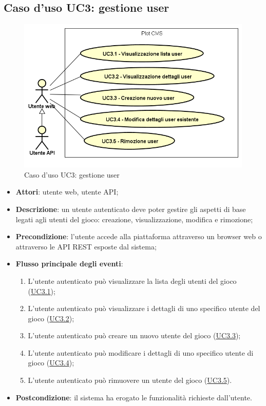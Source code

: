 \subsection{Caso d'uso UC3: gestione user}

        \begin{figure}[H]
            \centering
            \includegraphics[scale=0.95, width=\textwidth]{immagini/usecase/UC3.png}
            \caption{Caso d'uso UC3: gestione user}\label{fig:UC3} 
        \end{figure}
\begin{itemize}
\item \textbf{Attori}: utente web, utente API;
\item \textbf{Descrizione}: un utente autenticato deve poter gestire gli aspetti di base legati agli utenti del gioco: creazione, visualizzazione, modifica e rimozione; 
      \item \textbf{Precondizione}: l'utente accede alla piattaforma attraverso un browser web o attraverso le API REST esposte dal sistema;

        \item \textbf{Flusso principale degli eventi}:
          \begin{enumerate}
          \item L'utente autenticato può visualizzare la lista degli utenti del gioco (\hyperlink{UC3.1}{UC3.1});
          \item L'utente autenticato può visualizzare i dettagli di uno specifico utente del gioco (\hyperlink{UC3.2}{UC3.2});
          \item L'utente autenticato può creare un nuovo utente del gioco (\hyperlink{UC3.3}{UC3.3});
          \item L'utente autenticato può modificare i dettagli di uno specifico utente di gioco (\hyperlink{UC3.4}{UC3.4});
          \item L'utente autenticato può rimuovere un utente del gioco (\hyperlink{UC3.5}{UC3.5}).

      \end{enumerate}
    \item \textbf{Postcondizione}: il sistema ha erogato le funzionalità richieste dall'utente.
  \end{itemize}
\hypertarget{UC3.1}{}
